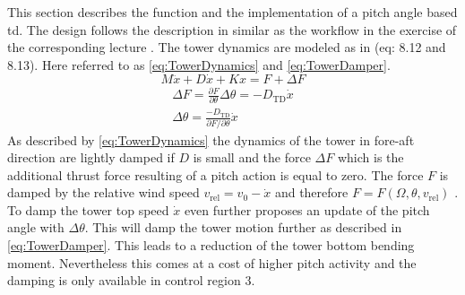 This section describes the function and the implementation of a pitch angle based \gls{td}. 
The design follows the description in \cite{WindEnergyHandbook} similar as the workflow in the exercise of the corresponding lecture \cite{SchlipfLecture}. 
The tower dynamics are modeled as in \cite{WindEnergyHandbook} (eq: 8.12 and 8.13). 
Here referred to as \ref{eq:TowerDynamics} and \ref{eq:TowerDamper}.
\begin{equation}
	M\ddot{x} + D\dot{x} + Kx = F + \Delta F
	\label{eq:TowerDynamics}
\end{equation}
\begin{equation}
	\begin{aligned}
		\Delta F = \frac{\partial F}{\partial \theta}\Delta\theta = -D_{\text{TD}}\dot{x}\\
		\Delta\theta = \frac{-D_{\text{TD}}}{\partial F/\partial \theta}\dot{x}
	\end{aligned}
	\label{eq:TowerDamper}
\end{equation}
As described by \ref{eq:TowerDynamics} the dynamics of the tower in fore-aft direction are lightly damped if $D$ is small and the force $\Delta F$ which is the additional thrust force resulting of a pitch action is equal to zero. The force $F$ is damped by the relative wind speed $v_{\text{rel}} = v_0 - \dot{x}$ and therefore $F = F(\Omega, \theta, v_{\text{rel}})$ \cite{SchlipfLecture}. To damp the tower top speed $\dot{x}$ even further \cite{WindEnergyHandbook} proposes an update of the pitch angle with $\Delta\theta$. This will damp the tower motion further as described in \ref{eq:TowerDamper}. This leads to a reduction of the tower bottom bending moment. Nevertheless this comes at a cost of higher pitch activity and the damping is only available in control region 3. 

